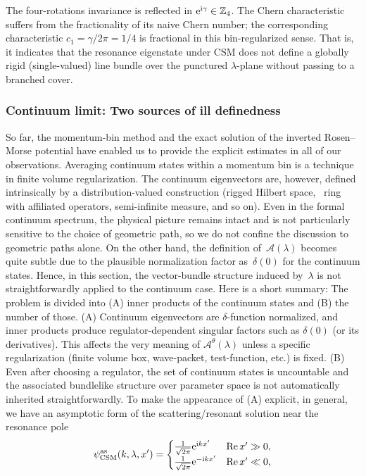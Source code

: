 The four-rotations invariance is reflected in $\mathrm{e}^{\mathrm{i} \gamma}\in\mathbb{Z}_4$. The Chern characteristic suffers from the fractionality of its naive Chern number; the corresponding characteristic $c_1=\gamma/2\pi=1/4$ is fractional in this bin-regularized sense.
That is, it indicates that the resonance eigenstate under CSM does not define a globally rigid (single-valued) line bundle over the punctured
$\lambda$-plane without passing to a branched cover.
\subsubsection{Continuum limit: Two sources of ill definedness}
So far, the momentum-bin method and the exact solution of the inverted Rosen--Morse potential have enabled us to provide the explicit estimates in all of our observations.
Averaging continuum states within a momentum bin is a technique in finite volume regularization.
The continuum eigenvectors are, however, defined intrinsically by a distribution-valued construction (rigged Hilbert space, \vN\ ring with affiliated operators, semi-infinite measure, and so on).
Even in the formal continuum spectrum, the physical picture remains intact and is not particularly sensitive to the choice of geometric path, so we do not confine the discussion to geometric paths alone.
On the other hand, the definition of~$\mathcal{A}(\lambda)$ becomes quite subtle due to the plausible normalization factor as~$\delta(0)$ for the continuum states.
Hence, in this section, the vector-bundle structure induced by~$\lambda$ is not straightforwardly applied to the continuum case.
Here is a short summary:
The problem is divided into (A) inner products of the continuum states and (B) the number of those.
(A) Continuum eigenvectors are $\delta$-function normalized, and inner products produce regulator-dependent singular factors such as $\delta(0)$ (or its derivatives). This affects the very meaning of $\mathcal{A}^\theta(\lambda)$ unless a specific regularization (finite volume box, wave-packet, test-function, etc.) is fixed.
(B) Even after choosing a regulator, the set of continuum states is uncountable and the associated bundlelike structure over parameter space is not automatically inherited straightforwardly.
To make the appearance of (A) explicit, in general, we have an asymptotic form of the scattering/resonant solution near the resonance pole
\begin{align}
    \psi^{\mathrm{as}}_{\mathrm{CSM}}(k,\lambda,x') =
    \begin{cases}
        \frac{1}{\sqrt{2\pi}} \mathrm{e}^{\mathrm{i} kx'} & \operatorname{Re} x'\gg0, \\
        \frac{1}{\sqrt{2\pi}} \mathrm{e}^{-\mathrm{i} kx'} & \operatorname{Re} x'\ll0,
    \end{cases}
\end{align}
